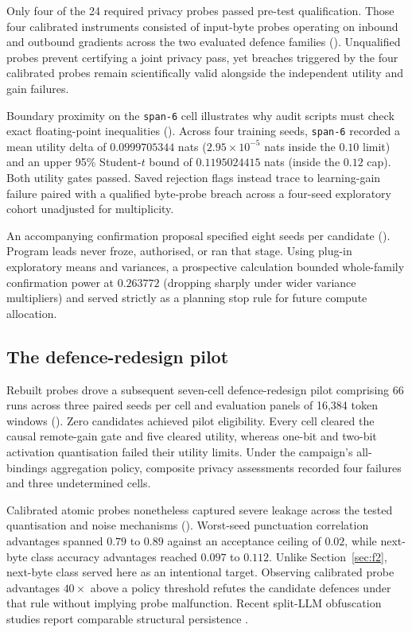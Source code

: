 Only four of the 24 required privacy probes passed pre-test qualification.
Those four calibrated instruments consisted of input-byte probes operating
on inbound and outbound gradients across the two evaluated defence families
(). Unqualified probes prevent certifying a joint privacy
pass, yet breaches triggered by the four calibrated probes remain
scientifically valid alongside the independent utility and gain failures.

Boundary proximity on the \texttt{span-6} cell illustrates why audit
scripts must check exact floating-point inequalities ().
Across four training seeds, \texttt{span-6} recorded a mean utility delta
of $0.0999705344$ nats ($2.95\times 10^{-5}$ nats inside the $0.10$ limit)
and an upper 95\% Student-$t$ bound of $0.1195024415$ nats (inside the
$0.12$ cap). Both utility gates passed. Saved rejection flags instead trace
to learning-gain failure paired with a qualified byte-probe breach across a
four-seed exploratory cohort unadjusted for multiplicity.

An accompanying confirmation proposal specified eight seeds per candidate
(). Program leads never froze, authorised, or ran that stage.
Using plug-in exploratory means and variances, a prospective calculation
bounded whole-family confirmation power at $0.263772$ (dropping sharply
under wider variance multipliers) and served strictly as a planning stop
rule for future compute allocation.

\subsection{The defence-redesign pilot}
\label{sec:f4}

Rebuilt probes drove a subsequent seven-cell defence-redesign pilot
comprising 66 runs across three paired seeds per cell and evaluation panels
of 16,384 token windows (). Zero candidates achieved pilot
eligibility. Every cell cleared the causal remote-gain gate and five
cleared utility, whereas one-bit and two-bit activation quantisation failed
their utility limits. Under the campaign's all-bindings aggregation policy,
composite privacy assessments recorded four failures and three undetermined
cells.

Calibrated atomic probes nonetheless captured severe leakage across the
tested quantisation and noise mechanisms (). Worst-seed
punctuation correlation advantages spanned $0.79$ to $0.89$ against an
acceptance ceiling of $0.02$, while next-byte class accuracy advantages
reached $0.097$ to $0.112$. Unlike Section~\ref{sec:f2}, next-byte class served here as an intentional
target. Observing calibrated probe advantages $40\times$ above a
policy threshold refutes the candidate defences under that rule without
implying probe malfunction. Recent split-LLM obfuscation studies report
comparable structural persistence \cite{privpair2026,mixguard2026}.

